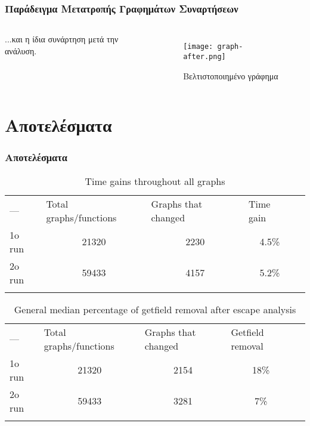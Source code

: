 \documentclass[greek]{beamer}
\begin{document}
\begin{frame}
\frametitle{Παράδειγμα Μετατροπής Γραφημάτων Συναρτήσεων}
\begin{columns}[c]
...και η ίδια συνάρτηση μετά την ανάλυση.
\begin{figure}
\caption{Βελτιστοποιημένο γράφημα}
\texttt{[image: graph-after.png]}
\end{figure}
\end{columns}
\end{frame}


\section{Αποτελέσματα}

\begin{frame}
\frametitle{Αποτελέσματα}

\begin{table}[h]
\centering
\caption{\textlatin{Time gains throughout all graphs}}
\label{table-time}
\begin{tabular}{lllll}

–– & \cellcolor[HTML]{C0C0C0}\textlatin{Total graphs/functions}
& \cellcolor[HTML]{C0C0C0}\textlatin{Graphs that changed}
& \cellcolor[HTML]{C0C0C0}\textlatin{Time gain} &  \\
\cellcolor[HTML]{C0C0C0}1o \textlatin{run} & \multicolumn{1}{c}{21320} & 
\multicolumn{1}{c}{2230} & \multicolumn{1}{c}{4.5\%} &  \\
\cellcolor[HTML]{C0C0C0}2o \textlatin{run} & \multicolumn{1}{c}{59433} & 
\multicolumn{1}{c}{4157} & \multicolumn{1}{c}{5.2\%} &  \\
 &  &  &  & 

\end{tabular}
\end{table}

\begin{table}[]
\centering
\caption{\textlatin{General median percentage of getfield
removal after escape analysis}}
\label{table-getfield}
\begin{tabular}{lllll}
–– & \cellcolor[HTML]{C0C0C0}\textlatin{Total graphs/functions}
& \cellcolor[HTML]{C0C0C0}\textlatin{Graphs that changed}
& \cellcolor[HTML]{C0C0C0}\textlatin{Getfield removal} &  \\
\cellcolor[HTML]{C0C0C0}1o \textlatin{run} & \multicolumn{1}{c}{21320}
& \multicolumn{1}{c}{2154} & \multicolumn{1}{c}{18\%} &  \\
\cellcolor[HTML]{C0C0C0}2o \textlatin{run} & \multicolumn{1}{c}{59433}
& \multicolumn{1}{c}{3281} & \multicolumn{1}{c}{7\%} &  \\
 &  &  &  & 
\end{tabular}
\end{table}
\end{frame}
\end{document}
